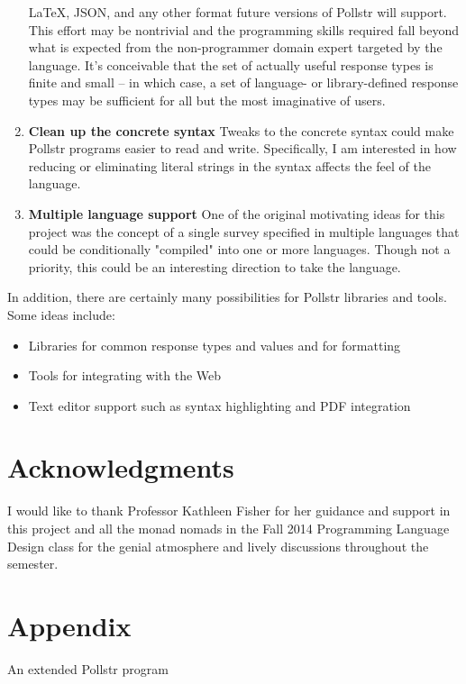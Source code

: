 \documentclass[pldi]{sigplanconf-pldi15}
\begin{document}
\begin{enumerate}
  LaTeX, JSON, and any other format future versions of Pollstr will support.
  This effort may be nontrivial and the programming skills required fall 
  beyond what is expected from the non-programmer domain expert targeted by the
  language. It's conceivable that the set of actually useful response types is 
  finite and small -- in which case, a set of language- or library-defined 
  response types may be sufficient for all but the most imaginative of users.
  \item \textbf{Clean up the concrete syntax} Tweaks to the concrete syntax 
  could make Pollstr programs easier to read and write. Specifically, I am 
  interested in how reducing or eliminating literal strings in the syntax affects 
  the feel of the language.
  \item \textbf{Multiple language support} One of the original motivating ideas
  for this project was the concept of a single survey specified in multiple languages
  that could be conditionally "compiled" into one or more languages. Though
  not a priority, this could be an interesting direction to take the language.
\end{enumerate}

In addition, there are certainly many possibilities for Pollstr libraries and
tools. Some ideas include:
\begin{itemize} \itemsep1pt \parskip0pt 
\item Libraries for common response types and values and for formatting
\item Tools for integrating with the Web
\item Text editor support such as syntax highlighting and PDF integration
\end{itemize}

\section{Acknowledgments}
I would like to thank Professor Kathleen Fisher for her guidance and support in this 
project and all the monad nomads in the Fall 2014 Programming Language Design 
class for the genial atmosphere and lively discussions throughout the 
semester.

\nocite{*}
{}


\newpage

\onecolumn
\appendix
\section{Appendix}{An extended Pollstr program}\label{sec:program}
\end{document}
